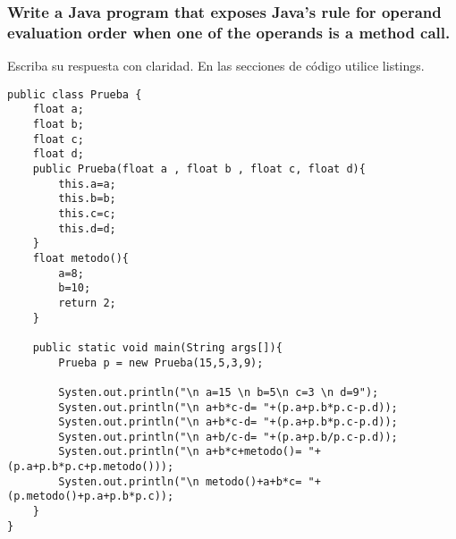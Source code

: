 \subsubsection{Write a Java program that exposes Java’s rule for operand evaluation 
order when one of the operands is a method call.}

Escriba su respuesta con claridad. En las secciones de código utilice listings.

\lstset{language = Java} 
\begin{lstlisting}[frame = single] %Comienzo del Código
public class Prueba {
	float a;
	float b;
	float c;
	float d; 
	public Prueba(float a , float b , float c, float d){
		this.a=a;
		this.b=b;
		this.c=c;
		this.d=d;
	}
	float metodo(){
		a=8;
		b=10;
		return 2;
	}
	
	public static void main(String args[]){
		Prueba p = new Prueba(15,5,3,9);
		
		Systen.out.println("\n a=15 \n b=5\n c=3 \n d=9");
		Systen.out.println("\n a+b*c-d= "+(p.a+p.b*p.c-p.d));
		Systen.out.println("\n a+b*c-d= "+(p.a+p.b*p.c-p.d));
		Systen.out.println("\n a+b/c-d= "+(p.a+p.b/p.c-p.d));
		Systen.out.println("\n a+b*c+metodo()= "+(p.a+p.b*p.c+p.metodo()));
		Systen.out.println("\n metodo()+a+b*c= "+(p.metodo()+p.a+p.b*p.c));
	}
}
	
\end{lstlisting}
